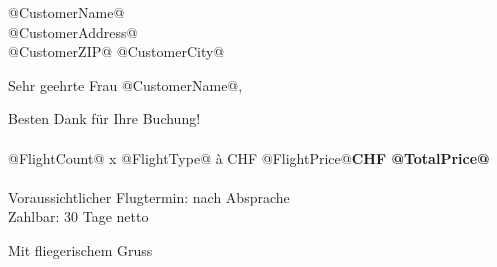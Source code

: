 \documentclass[RechnungTemplate]{scrlttr2}
\begin{document}
\begin{letter}
{@CustomerName@\\
@CustomerAddress@\\
@CustomerZIP@ @CustomerCity@
}
\opening{Sehr geehrte Frau @CustomerName@,}

Besten Dank für Ihre Buchung!\\
\\
@FlightCount@ x @FlightType@ à CHF @FlightPrice@\hfill \textbf{CHF @TotalPrice@}\\
\\
Voraussichtlicher Flugtermin: nach Absprache\\
Zahlbar: 30 Tage netto

\closing{Mit fliegerischem Gruss}
\end{letter}
\end{document}
